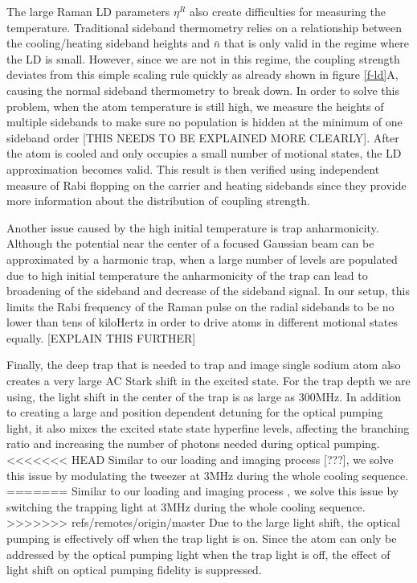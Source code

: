 \documentclass[aps,prl,twocolumn,groupedaddress]{revtex4-1}
\begin{document}
The large Raman LD parameters $\eta^R$
also create difficulties for measuring the temperature. Traditional sideband thermometry relies on
a relationship between the cooling/heating sideband heights and $\bar n$ that is only valid in the regime where the LD is small. However, since we are not in this regime, the coupling strength deviates from this simple scaling rule quickly as already
shown in figure \ref{f-ld}A, causing the normal sideband thermometry to break down.
In order to solve this problem, when the atom temperature is still high,
we measure the heights of multiple sidebands to make sure no population is hidden at the
minimum of one sideband order [THIS NEEDS TO BE EXPLAINED MORE CLEARLY]. After the atom is cooled and only occupies a small number of motional states, the LD approximation becomes valid.
This result is then verified using independent measure of Rabi flopping on the carrier and heating
sidebands since they provide more information about the distribution of coupling strength.

Another issue caused by the high initial temperature is trap anharmonicity.
Although the potential near the center of a focused Gaussian beam can be approximated
by a harmonic trap, when a large number of levels are populated due to high initial temperature
the anharmonicity of the trap can lead to broadening of the sideband and decrease of
the sideband signal. In our setup, this limits the Rabi frequency of the Raman pulse
on the radial sidebands to be no lower than tens of kiloHertz in order to drive atoms in
different motional states equally. [EXPLAIN THIS FURTHER]

Finally, the deep trap that is needed to trap and image single sodium atom also creates
a very large AC Stark shift in the excited state. For the trap depth we are using, the
light shift in the center of the trap is as large as $300\text{MHz}$.
In addition to creating a large and position dependent detuning for the optical pumping light,
it also mixes the excited state state hyperfine levels,
affecting the branching ratio and increasing the number of photons needed during optical pumping.
<<<<<<< HEAD
Similar to our loading and imaging process [???], we solve this issue by modulating the
tweezer at $3\text{MHz}$ during the whole cooling sequence.
=======
Similar to our loading and imaging process \cite{Hutzler2016},
we solve this issue by switching the trapping light at $3\text{MHz}$
during the whole cooling sequence.
>>>>>>> refs/remotes/origin/master
Due to the large light shift, the optical pumping is effectively off when the trap light is on.
Since the atom can only be addressed by the optical pumping light when the trap light is off,
the effect of light shift on optical pumping fidelity is suppressed.
\end{document}
